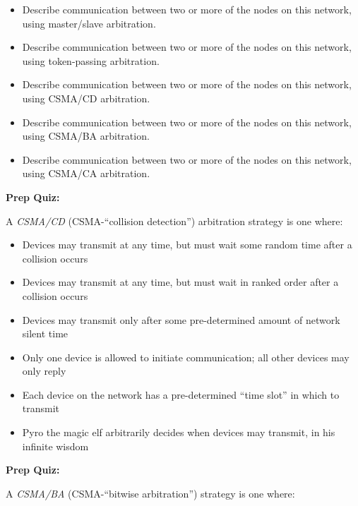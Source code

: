 \begin{itemize}
\item{} Describe communication between two or more of the nodes on this network, using master/slave arbitration.
\item{} Describe communication between two or more of the nodes on this network, using token-passing arbitration.
\item{} Describe communication between two or more of the nodes on this network, using CSMA/CD arbitration.
\item{} Describe communication between two or more of the nodes on this network, using CSMA/BA arbitration.
\item{} Describe communication between two or more of the nodes on this network, using CSMA/CA arbitration.
\end{itemize}








\vfil \eject

\noindent
{\bf Prep Quiz:}

A {\it CSMA/CD} (CSMA-``collision detection'')  arbitration strategy is one where:

\begin{itemize}
\item{} Devices may transmit at any time, but must wait some random time after a collision occurs
\vskip 5pt 
\item{} Devices may transmit at any time, but must wait in ranked order after a collision occurs
\vskip 5pt 
\item{} Devices may transmit only after some pre-determined amount of network silent time
\vskip 5pt 
\item{} Only one device is allowed to initiate communication; all other devices may only reply
\vskip 5pt 
\item{} Each device on the network has a pre-determined ``time slot'' in which to transmit
\vskip 5pt 
\item{} Pyro the magic elf arbitrarily decides when devices may transmit, in his infinite wisdom
\end{itemize}








\vfil \eject

\noindent
{\bf Prep Quiz:}

A {\it CSMA/BA} (CSMA-``bitwise arbitration'') strategy is one where:

